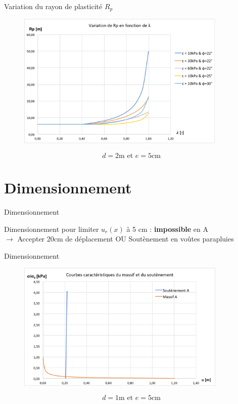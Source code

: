 \documentclass{beamer}
\begin{document}
\begin{frame}{Variation du rayon de plasticité $R_p$}

\begin{figure}
\centering
\includegraphics[width=10cm]{Rp.pdf}
\end{figure}
\[d=2\text{m et }e=5\text{cm}\]    
\end{frame}


\section{Dimensionnement}

\begin{frame}{Dimensionnement}
\begin{center}
Dimensionnement pour limiter $u_r(x)$ à 5 cm : \textbf{impossible} en A\\\vspace{0.5cm}
$\longrightarrow$ Accepter 20cm de déplacement OU Soutènement en voûtes parapluies
\end{center}
\end{frame}

\begin{frame}{Dimensionnement}

\begin{figure}
\centering
\includegraphics[width=10cm]{dimA.png}
\end{figure}
    \[d=1\text{m et }e=5\text{cm}\] 
\end{frame}
\end{document}
